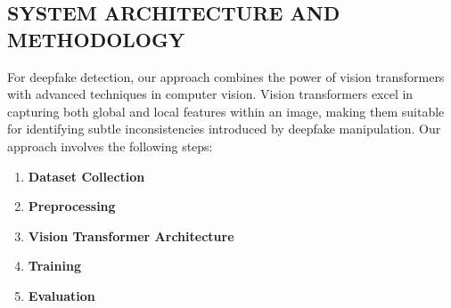 \subsection{SYSTEM ARCHITECTURE AND METHODOLOGY }

For deepfake detection, our approach combines the power of vision transformers with advanced techniques in computer vision. Vision transformers excel in capturing both global and local features within an image, making them suitable for identifying subtle inconsistencies introduced by deepfake manipulation.
\newpage
Our approach involves the following steps:
\vspace{0.2cm}
\begin{enumerate}
    \item \textbf{Dataset Collection}
    \item \textbf{Preprocessing}
    \item \textbf{Vision Transformer Architecture}
    \item \textbf{Training}
    \item \textbf{Evaluation}

\end{enumerate}





